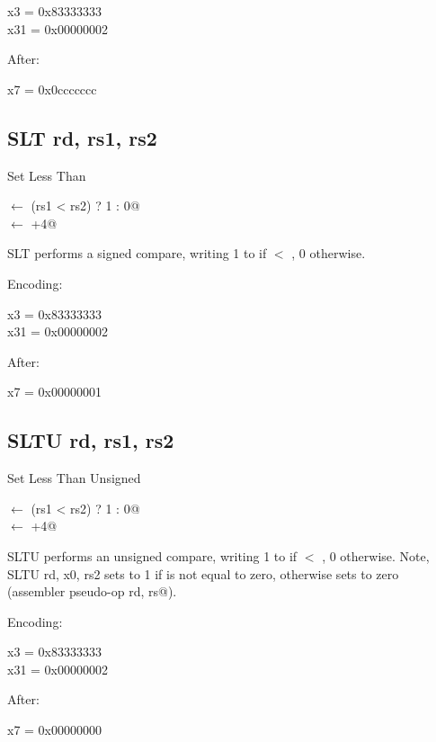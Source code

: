 x3  = 0x83333333\\
x31 = 0x00000002

After:

x7 = 0x0ccccccc


\subsection{SLT rd, rs1, rs2}

Set Less Than

\verb@rd@ $\leftarrow$ \verb@(rs1 < rs2) ? 1 : 0@\\
\verb@pc@ $\leftarrow$ \verb@pc+4@

SLT performs a signed compare, writing 1 to  if  $<$ , 0 
otherwise.~\cite[p.~15]{rvismv1v22:2017}

Encoding:


x3  = 0x83333333\\
x31 = 0x00000002

After:

x7 = 0x00000001

\subsection{SLTU rd, rs1, rs2}

Set Less Than Unsigned 

\verb@rd@ $\leftarrow$ \verb@(rs1 < rs2) ? 1 : 0@\\
\verb@pc@ $\leftarrow$ \verb@pc+4@

SLTU performs an unsigned compare, writing 1 to  if  $<$ , 0 otherwise. 
Note, SLTU rd, x0, rs2 sets  to 1 if  is not equal to zero, otherwise 
sets  to zero (assembler pseudo-op \verb@SNEZ rd, rs@).~\cite[p.~15]{rvismv1v22:2017}

Encoding:


x3  = 0x83333333\\
x31 = 0x00000002

After:

x7 = 0x00000000

